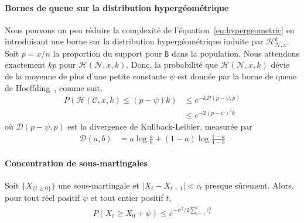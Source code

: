 \documentclass[a4,twocolumn,10pt]{article}
\theoremstyle{definition}
\begin{document}
\begin{appendices}
\paragraph{Bornes de queue sur la distribution hypergéométrique} Nous pouvons un peu réduire la complexité de l'équation~\ref{eq:hypergeometric} en introduisant une borne sur la distribution hypergéométrique induite par $\mathcal{H}^k_{\mathcal{N},x}$.
Soit $p=x/n$ la proportion du support pour $\mathtt{B}$ dans la population.
Nous attendons exactement $kp$ pour $\mathcal{H}(\mathcal{N}, x, k)$.
Donc, la probabilité que $\mathcal{H}(\mathcal{N}, x, k)$ dévie de la moyenne de plus d'une petite constante $\psi$ est donnée par la borne de queue de Hoeffding~\cite{hoeffding1963probability}, comme suit,
\begin{equation}
\begin{split}
    P(\mathcal{H}(\mathcal{C}, x, k) \leq (p-\psi)k) &\leq e^{-k\mathcal{D}(p-\psi, p)}\\
    &\leq e^{-2(p-\psi)^2k}
\end{split}
\end{equation}
où $\mathcal{D}(p-\psi, p)$ est la divergence de Kullback-Leibler, measurée par
\begin{equation}
\begin{split}
    \mathcal{D}(a, b) &= a \log \frac{a}{b} + (1 - a) \log \frac{1 - a}{1 - b}
\end{split}
\end{equation}

\paragraph{Concentration de sous-martingales}
Soit $\{X_{\{t \geq 0\}}\}$ une sous-martingale et $|X_t - X_{t-1}| < c_t$ presque sûrement. Alors, pour tout réel positif $\psi$ et tout entier positif $t$, 
\begin{equation}
\begin{split}
P(X_t \geq X_0 + \psi) \leq e^{-\psi^2 / 2\sum_{i = 1}^{t} c_t^2}
\end{split}
\label{eq:submartingale}
\end{equation}


\end{appendices}
\end{document}
